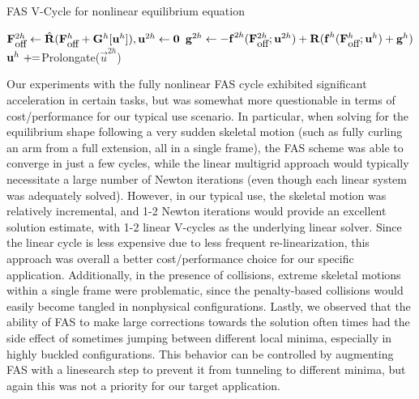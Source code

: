\begin{algorithm}[h]
\caption{FAS V-Cycle  for nonlinear equilibrium equation}\label{alg_fas_vcycle}
\begin{algorithmic}[1]
\State {}
\State $\mathbf{F}_{\mbox{\small off}}^{2h}\gets\hat{\mathbf{R}}(\mathbf{F}_{\mbox{\small off}}^h+\mathbf{G}^h[\vec{u}^h]),\vec{u}^{2h}\gets\vec{0}$
\State $\vec{g}^{2h}\gets-\vec{f}^{2h}(\mathbf{F}_{\mbox{\small off}}^{2h};\vec{u}^{2h})+\mathbf{R}(\vec{f}^h(\mathbf{F}_{\mbox{\small off}}^h;\vec{u}^h)+\vec{g}^h)$
\State {}
\State $\vec{u}^{h}\plusequals $Prolongate($\vec{u}^{2h}$)
\State {}
\EndProcedure
\end{algorithmic}
\end{algorithm}

Our experiments with the fully nonlinear FAS cycle exhibited significant acceleration in certain tasks, but was somewhat more questionable in terms of cost/performance for our typical
use scenario. In particular, when solving for the equilibrium shape following a very sudden skeletal motion (such as fully curling an arm from a full extension, all in a single frame),
the FAS scheme was able to converge in just a few cycles, while the linear multigrid approach would typically necessitate a large number of Newton iterations (even though each linear
system was adequately solved). However, in our typical use, the skeletal motion was relatively incremental, and 1-2 Newton iterations would provide an excellent solution estimate, with
1-2 linear V-cycles as the underlying linear solver. Since the linear cycle is less expensive due to less frequent re-linearization, this approach was overall a better cost/performance
choice for our specific application. Additionally, in the presence of collisions, extreme skeletal motions within a single frame were problematic, since the penalty-based collisions
would easily become tangled in nonphysical configurations. Lastly, we observed that the ability of FAS to make large corrections towards the solution often times had the side effect of
sometimes jumping between different local minima, especially in highly buckled configurations. This behavior can be controlled by augmenting FAS with a linesearch step to prevent it
from tunneling to different minima, but again this was not a priority for our target application.
